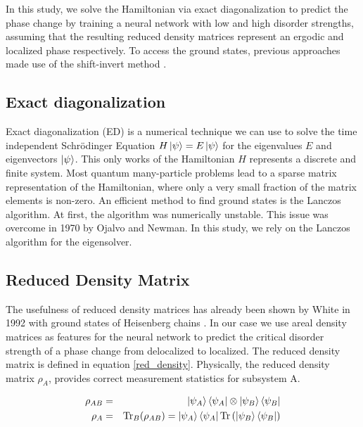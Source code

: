\documentclass[reprint,amsmath,amssymb,aps,prb]{revtex4-2}
\begin{document}
In this study, we solve the Hamiltonian via exact diagonalization to predict the phase change by training a neural network with low and high disorder strengths, assuming that the resulting reduced density matrices represent an ergodic and localized phase respectively. To access the ground states, previous approaches made use of the shift-invert method \cite{Luitz2015}.



\subsection{Exact diagonalization}

Exact diagonalization (ED) is a numerical technique we can use to solve the time independent Schrödinger Equation $H\ket{\psi}=E\ket{\psi}$ for the eigenvalues $E$ and eigenvectors $\ket{\psi}$. This only works of the Hamiltonian $H$ represents a discrete and finite system. Most quantum many-particle problems lead to a sparse matrix representation of the Hamiltonian, where only a very small fraction of the matrix
elements is non-zero.\cite{Weisse2008} An efficient method to find ground states is the Lanczos algorithm.\cite{Lanczos1950} At first, the algorithm was numerically unstable. This issue was overcome in 1970 by Ojalvo and Newman.\cite{Ojalvo1970} In this study, we rely on the Lanczos algorithm for the eigensolver.

\subsection{Reduced Density Matrix}

The usefulness of reduced density matrices has already been shown by White in 1992 with ground states of Heisenberg chains \cite{White1992}. In our case we use areal density matrices as features for the neural network to predict the critical disorder strength of a phase change from delocalized to localized. The reduced density matrix is defined in equation \ref{red_density}. Physically, the reduced density matrix $\rho_A$, provides correct measurement statistics for subsystem A.

\begin{eqnarray}
\rho_{AB}&=&\ket{\psi_A}\bra{\psi_A}\otimes\ket{\psi_B}\bra{\psi_B}\\
\rho_A&=&\text{Tr}_B(\rho_{AB})=\ket{\psi_A}\bra{\psi_A}\text{Tr}\left(\ket{\psi_B}\bra{\psi_B}\right)\label{red_density}
\end{eqnarray}%
\end{document}
